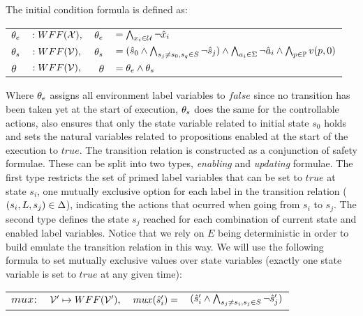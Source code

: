 The initial condition formula is defined as:

\vspace{1em}
\footnotesize
	\begin{tabular}{l l r l}
		${\theta_e}$&$:WFF({\mathcal{X}}),$ &
		${\theta_e}$&$= \bigwedge_{x_i \in \mathcal{U}}\neg \hat{x}_i$\\
		${\theta_s}$&$:WFF({\mathcal{V}}),$ &
		${\theta_s}$&$= (\hat{s}_{0} \wedge\bigwedge_{s_j \neq s_0, s_q \in S}\neg \hat{s}_{j}) \wedge \bigwedge_{a_i \in \Sigma}\neg \hat{a}_i \wedge \bigwedge_{p \in \mathbb{P}}v(p,0)$\\
		$\theta$&$:WFF({\mathcal{V}}),$ &
		$\theta$&$= {\theta_e} \wedge {\theta_s}$\\		
	\end{tabular}
\normalsize
\vspace{1em}

Where ${\theta_e}$ assigns all environment label variables to $false$ since no transition has been taken yet at the start of execution, ${\theta_s}$ does the same for the controllable actions, also ensures that only the state variable related to initial state $s_0$ holds and sets the natural variables related to propositions enabled at the start of the execution to $true$.
The transition relation is constructed as a conjunction of safety formulae. These can be split into two types, \emph{enabling} and \emph{updating} formulae. The first type restricts the set of primed label variables that can be set to $true$ at state $s_i$, one mutually exclusive option for each label \actionLabel in the transition relation ($(s_i,L,s_j) \in \Delta$), indicating the actions that ocurred when going from $s_i$ to $s_j$. The second type defines the state $s_j$ reached for each combination of current state and enabled label variables. Notice that we rely on $E$ being deterministic in order to build emulate the transition relation in this way.
We will use the following formula to set mutually exclusive values over state variables (exactly one state variable is set to $true$ at any given time):

\begin{center}
	\begin{tabular}{r r r l}
$mux:$&${\mathcal{V}}' \mapsto WFF({\mathcal{V}}'),$&$mux(\hat{s}_{i}') = $&$(\hat{s}_{i}' \wedge\bigwedge_{s_j \neq s_i, s_j \in S}\neg \hat{s}_{j}')$
	\end{tabular}
\end{center}

